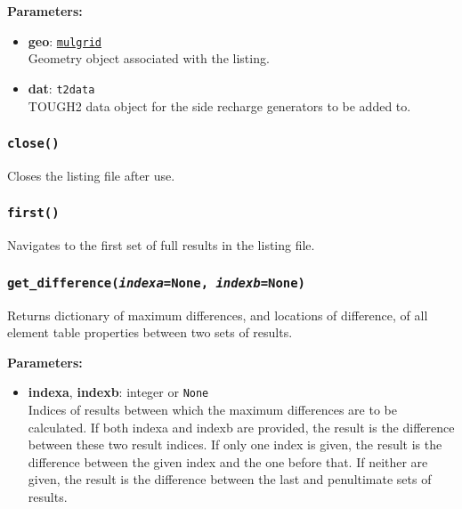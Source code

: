 \textbf{Parameters:}
\begin{itemize}
\item \textbf{geo}: \hyperref[mulgrids]{\texttt{mulgrid}}\\
  Geometry object associated with the listing.
\item \textbf{dat}: \texttt{t2data}\\
  TOUGH2 data object for the side recharge generators to be added to.
\end{itemize}

\begin{snugshade}
\subsubsection{\texttt{close()}}
\end{snugshade}
\label{sec:t2listing:close}

Closes the listing file after use.

\begin{snugshade}
\subsubsection{\texttt{first()}}
\end{snugshade}
\label{sec:t2listing:first}

Navigates to the first set of full results in the listing file.

\begin{snugshade}
\subsubsection{\texttt{get\_difference(\emph{indexa}=None, \emph{indexb}=None)}}
\end{snugshade}
\label{sec:t2listing:get_difference}

Returns dictionary of maximum differences, and locations of difference, of all element table properties between two sets of results.

\textbf{Parameters:}
\begin{itemize}
\item \textbf{indexa}, \textbf{indexb}: integer or \texttt{None}\\
  Indices of results between which the maximum differences are to be calculated.  If both indexa and indexb are provided, the result is the difference between these two result indices.  If only one index is given, the result is the difference between the given index and the one before that.  If neither are given, the result is the difference between the last and penultimate sets of results.
\end{itemize}

